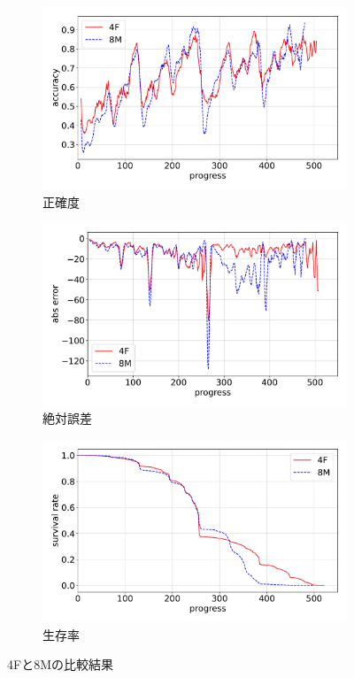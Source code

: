 \begin{figure}[t]
\centering
\begin{subfigure}[b]{0.8\linewidth}
    \includegraphics[width=\linewidth]{pdf/compare/NT4F_and_NT8M/accuracy.pdf}
    \caption{正確度}
    \label{fig:NT4F_and_NT8M_accuracy}
\end{subfigure}
\begin{subfigure}[b]{0.8\linewidth}
    \includegraphics[width=\linewidth]{pdf/compare/NT4F_and_NT8M/error_abs.pdf}
    \caption{絶対誤差}
    \label{fig:NT4F_and_NT8M_error_abs}
\end{subfigure}
\begin{subfigure}[b]{0.8\linewidth}
    \includegraphics[width=\linewidth]{pdf/compare/NT4F_and_NT8M/survival.pdf}
    \caption{生存率}
    \label{fig:NT4F_and_NT8M_survival}
\end{subfigure}
\caption{4Fと8Mの比較結果}
\label{fig:NT4F_and_NT8M_results}
\end{figure}

